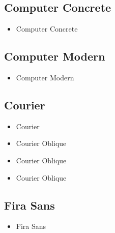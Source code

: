     \subsection{Computer Concrete}
    \begin{itemize}
        \item {\selectfont Computer Concrete}
    \end{itemize}


    \subsection{Computer Modern}
    \begin{itemize}
        \item {\selectfont Computer Modern}
    \end{itemize}


    \subsection{Courier}
    \begin{itemize}
        \item {\selectfont Courier}
        \item {\selectfont Courier Oblique}
        \item {\selectfont Courier Oblique}
        \item {\selectfont Courier Oblique}
    \end{itemize}


    \subsection{Fira Sans}
    \begin{itemize}
        \item {\selectfont Fira Sans}
    \end{itemize}


